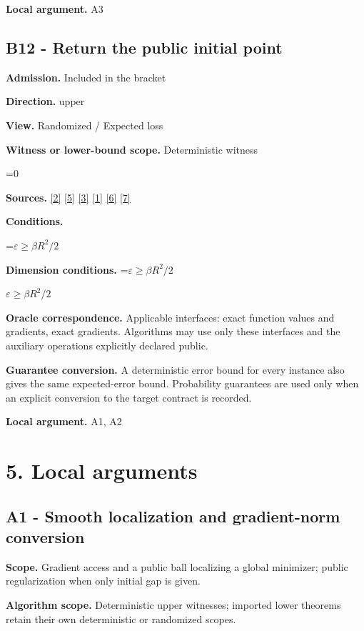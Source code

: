 \documentclass[10pt,a4paper]{article}
\newcommand{\AtlasMath}[1]{\par\begingroup\centering\setbox0=\hbox{$\displaystyle #1$}\ifdim\wd0>1.4\linewidth\typeout{ATLAS WIDE FORMULA: \the\wd0}\fi\ifdim\wd0>\linewidth\resizebox{\linewidth}{!}{\box0}\else\box0\fi\par\endgroup}
\newcommand{\AtlasInlineMath}[1]{\begingroup\setbox0=\hbox{$#1$}\ifdim\wd0>.4\linewidth\endgroup\AtlasMath{#1}\else\endgroup$#1$\fi}
\begin{document}
\textbf{Local argument.} A3

\subsection{B12 - Return the public initial point}
\textbf{Admission.} Included in the bracket

\textbf{Direction.} upper

\textbf{View.} Randomized / Expected loss

\textbf{Witness or lower-bound scope.} Deterministic witness

\AtlasMath{0}
\textbf{Sources.} \href{https://arxiv.org/pdf/2101.09740v2}{[2]} \href{https://arxiv.org/pdf/2609.33360v2}{[5]} \href{https://arxiv.org/pdf/2609.10874}{[3]} \href{https://arxiv.org/pdf/1405.4980}{[1]} \href{https://www2.isye.gatech.edu/~nemirovs/MOR_AccuracyCertificates.pdf}{[6]} \href{https://arxiv.org/pdf/2609.20701}{[7]}

\textbf{Conditions.} 
\AtlasMath{\varepsilon\ge\beta R^2/2}


\textbf{Dimension conditions.} \AtlasInlineMath{\varepsilon\ge\beta R^2/2}

\textbf{Oracle correspondence.} Applicable interfaces: exact function values and gradients, exact gradients. Algorithms may use only these interfaces and the auxiliary operations explicitly declared public.

\textbf{Guarantee conversion.} A deterministic error bound for every instance also gives the same expected-error bound. Probability guarantees are used only when an explicit conversion to the target contract is recorded.

\textbf{Local argument.} A1, A2

\section{5. Local arguments}
\subsection{A1 - Smooth localization and gradient-norm conversion}
\textbf{Scope.} Gradient access and a public ball localizing a global minimizer; public regularization when only initial gap is given.

\textbf{Algorithm scope.} Deterministic upper witnesses; imported lower theorems retain their own deterministic or randomized scopes.
\end{document}
